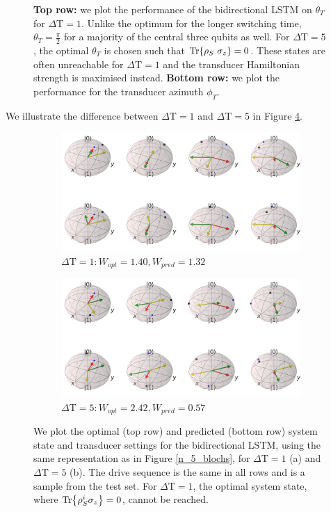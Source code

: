 \begin{figure}
\begin{subfigure}{0.32\textwidth}
	\end{subfigure}
	\caption{\textbf{Top row:} we plot the performance of the bidirectional LSTM on $\theta_T$ for $\Delta \mathrm{T} = 1$. Unlike the optimum for the longer switching time, $\theta_T = \frac{\pi}{2}$ for a majority of the central three qubits as well. For $\Delta \mathrm{T} = 5$, the optimal $\theta_T$ is chosen such that $\Tr{\rho_S \ \sigma_z} = 0$. These states are often unreachable for $\Delta \mathrm{T} = 1$ and the transducer Hamiltonian strength is maximised instead.  \textbf{Bottom row:} we plot the performance for the transducer azimuth $\phi_T$.}
	\label{dt1box}
\end{figure}

We illustrate the difference between $\Delta \mathrm{T} = 1$ and $\Delta \mathrm{T} = 5$ in Figure \ref{blochsdt15}.

\begin{figure}
	\centering
	\begin{subfigure}{0.85\textwidth}
		\centering
		\includegraphics[width=\textwidth]{img/bloch_comp_1_crop}
		\caption{$\Delta \mathrm{T} = 1: W_{opt} = 1.40, W_{pred} = 1.32$}
		\label{}
	\end{subfigure}
	\begin{subfigure}{0.85\textwidth}
		\centering
		\includegraphics[width=\textwidth]{img/bloch_comp_5_crop}
		\caption{$\Delta \mathrm{T} = 5: W_{opt} = 2.42, W_{pred} = 0.57$}
		\label{}
	\end{subfigure}
	\caption{We plot the optimal (top row) and predicted (bottom row) system state and transducer settings for the bidirectional LSTM, using the same representation as in Figure \ref{n_5_blochs}, for $\Delta \mathrm{T} = 1$ (a) and $\Delta \mathrm{T} = 5$ (b). The drive sequence is the same in all rows and is a sample from the test set. For $\Delta \mathrm{T} = 1$, the optimal system state, where $\Tr{\rho_S^i \sigma_z} = 0$, cannot be reached.}
	\label{blochsdt15}
\end{figure}